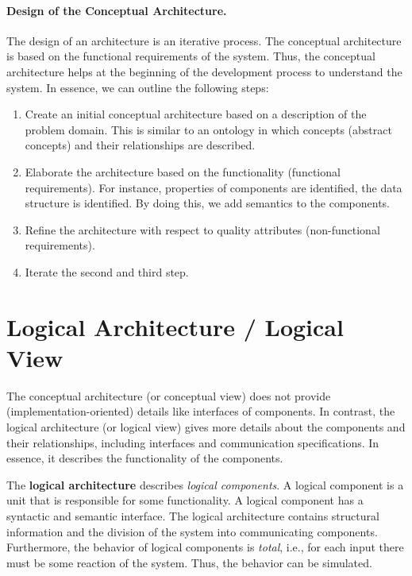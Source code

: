 \documentclass{llncs} %
\begin{document}
\paragraph{Design of the Conceptual Architecture.}
The design of an architecture is an iterative process. The conceptual architecture is based on the functional requirements of the system.
Thus, the conceptual architecture helps  at the beginning of the development process to
understand the system. In essence, we can outline the following steps:
 \begin{enumerate}
	 \item Create an initial conceptual architecture based on a description of the problem domain.
	         This is similar to an ontology in which concepts (abstract concepts) and their relationships
					      are described.
	 \item Elaborate the architecture based on the functionality (functional requirements).
	       For instance, properties of components are identified, the data structure is identified.
				 By doing this, we add semantics to the components.
	 \item Refine the architecture with respect to quality attributes (non-functional requirements).
	 \item Iterate the second and third step.
 \end{enumerate}


\section{Logical Architecture / Logical View}

The conceptual architecture (or conceptual view) does not provide (implementation-oriented) details
like interfaces of components.
In contrast, the logical architecture (or logical view) gives more details about the components
and their relationships, including interfaces and communication specifications.
In essence, it describes the functionality of the components.

The \textbf{logical architecture}  describes \emph{logical components}.
A logical component is a unit that is responsible for some functionality.
A logical component has a syntactic and semantic interface.
The logical architecture contains structural information
and the division of the system into communicating components.
Furthermore, the behavior of logical components is \emph{total},
i.e., for each input there must be some reaction of the system.
Thus, the behavior can be simulated.
\end{document}
